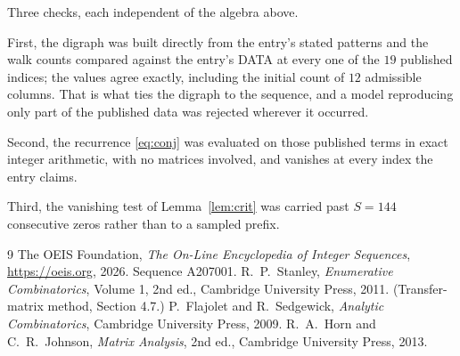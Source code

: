 \documentclass[11pt,a4paper]{article}
\theoremstyle{plain}
\theoremstyle{definition}
\begin{document}
Three checks, each independent of the algebra above.

First, the digraph was built directly from the entry's stated patterns and the walk counts
compared against the entry's DATA at every one of the $19$ published indices; the
values agree exactly, including the initial count of $12$ admissible columns. That is
what ties the digraph to the sequence, and a model reproducing only part of the published
data was rejected wherever it occurred.

Second, the recurrence \eqref{eq:conj} was evaluated on those published terms in exact
integer arithmetic, with no matrices involved, and vanishes at every index the entry claims.

Third, the vanishing test of Lemma~\ref{lem:crit} was carried past $S=144$ consecutive
zeros rather than to a sampled prefix.

\begin{thebibliography}{9}
 The OEIS Foundation, \emph{The On-Line Encyclopedia of Integer
Sequences}, \url{https://oeis.org}, 2026. Sequence A207001.
 R.~P.~Stanley, \emph{Enumerative Combinatorics}, Volume 1, 2nd ed.,
Cambridge University Press, 2011. (Transfer-matrix method, Section 4.7.)
 P.~Flajolet and R.~Sedgewick, \emph{Analytic Combinatorics}, Cambridge
University Press, 2009.
 R.~A.~Horn and C.~R.~Johnson, \emph{Matrix Analysis}, 2nd ed., Cambridge
University Press, 2013.
\end{thebibliography}
\end{document}
